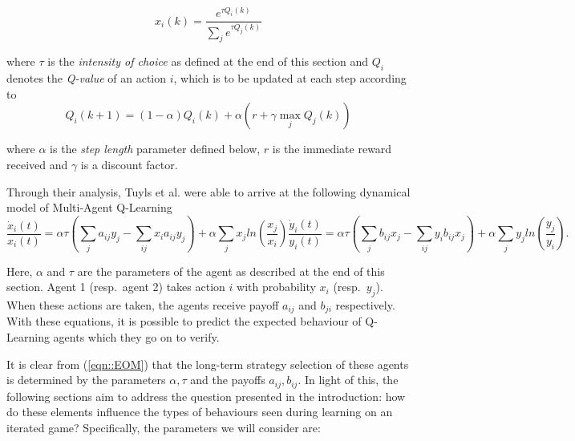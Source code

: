 \documentclass[sigconf]{aamas}
\begin{document}
\begin{equation}
    x_i(k) = \frac{e^{\tau Q_i(k)}}{\sum_j e^{\tau Q_j(k)}}
\end{equation}

where $\tau$ is the \textit{intensity of choice} as defined at the end of this section and $Q_i$ denotes the \textit{Q-value} of an action $i$, which is to be updated at each step according to
%
\begin{equation}
\label{eqn::Qupdate}
    Q_i(k+1) = (1 - \alpha) Q_i(k) + \alpha (r + \gamma \max_j Q_j(k))
\end{equation}

where $\alpha$ is the \textit{step length} parameter defined below, $r$ is the immediate reward received and $\gamma$ is a discount factor.

Through their analysis, Tuyls et al. were able to
arrive at the following dynamical model of Multi-Agent Q-Learning
%
\begin{subequations}
\label{eqn::EOM}
    \begin{equation}
        \frac{\dot{x}_i(t)}{x_i(t)} = \alpha \tau (\sum_{j} a_{ij} y_j - \sum_{i j} x_i a_{ij} y_j)
        + \alpha \sum_j x_j ln(\frac{x_j}{x_i}) 
    \end{equation}
    \begin{equation}
        \frac{\dot{y}_i(t)}{y_i(t)} = \alpha \tau (\sum_{j} b_{ij} x_j - \sum_{i j} y_i b_{ij} x_j)
        + \alpha \sum_j y_j ln(\frac{y_j}{y_i}).
    \end{equation}
\end{subequations}

Here, $\alpha$ and $\tau$ are the parameters of the agent as described at the end of this section. Agent 1 (resp.~agent 2) takes action $i$ with probability
$x_i$ (resp.~$y_j$).
When these actions are taken, the agents
receive payoff $a_{ij}$ and $b_{ji}$ respectively. With these equations, it is possible to
predict the expected behaviour of Q-Learning agents which they go on to verify.

It is clear from (\ref{eqn::EOM}) that the long-term strategy selection of
these agents is determined by the parameters $\alpha, \tau$ and the payoffs $a_{ij}, b_{ij}$. In light of this, the following sections aim to address the question presented in the introduction: how do these elements influence the types of behaviours seen during
learning on an iterated game? Specifically, the parameters we will consider are:
\end{document}
